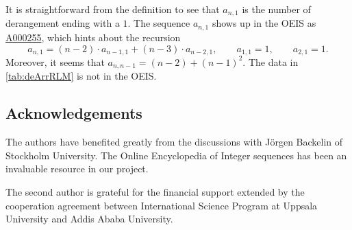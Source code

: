 \documentclass[reqno]{amsart}
\theoremstyle{definition}
\newcommand{\oeis}[1]{\href{http://oeis.org/#1}{#1}}
\begin{document}
It is straightforward from the definition to see that $a_{n,1}$ is the number of derangement ending with a $1$.
The sequence $a_{n,1}$ shows up in the OEIS as \oeis{A000255}, which hints about the recursion
\[
 a_{n,1} = (n-2) \cdot a_{n-1,1} + (n-3) \cdot a_{n-2,1}, \qquad a_{1,1} =1, \qquad a_{2,1} =1.
\]
Moreover, it seems that $a_{n,n-1} = (n-2) + (n-1)^2$.
The data in \cref{tab:deArrRLM} is not in the OEIS.


\subsection*{Acknowledgements}

The authors have benefited greatly from the discussions
with Jörgen Backelin of Stockholm University.
The Online Encyclopedia of Integer sequences \cite{OEIS} 
has been an invaluable resource in our project.

The second author is grateful for the financial support extended
by the cooperation agreement between International Science Program
at Uppsala University and Addis Ababa University.




\end{document}
